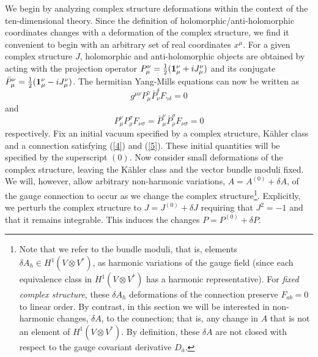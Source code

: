 \documentclass[12pt]{article}
\numberwithin{equation}{section}
\begin{document}
We begin by analyzing complex structure deformations within the context of the ten-dimensional theory. Since the definition of holomorphic/anti-holomorphic coordinates changes with a deformation of the complex structure, we find it convenient to begin with an arbitrary set of real coordinates $x^{\mu}$. For a given complex structure $J$, holomorphic and anti-holomorphic objects are obtained by acting with the projection operator $P_{\mu}^{\nu}=\frac{1}{2}({ \bf{1}}_{\mu}^{\nu}+iJ_{\mu}^{\nu})$ and its conjugate
${\bar{P}}_{\mu}^{\nu}=\frac{1}{2}({ \bf{1}}_{\mu}^{\nu}-iJ_{\mu}^{\nu})$. The hermitian Yang-Mills equations can now be written as
% 
\begin{equation}
g^{\mu\nu}P_{\mu}^{\gamma}{\bar{P}}_{\nu}^{\delta}F_{\gamma\delta}=0
\label{4}
\end{equation}
% 
and
% 
\begin{equation}
P_{\mu}^{\nu}P_{\rho}^{\sigma}F_{\nu\sigma}={\bar{P}}_{\mu}^{\nu}{\bar{P}}_{\rho}^{\sigma}F_{\nu\sigma}= 0 
\label{5}
\end{equation}
% 
respectively. Fix an initial vacuum specified by a complex structure, K\"ahler class and a connection satisfying (\ref{4}) and (\ref{5}). These initial quantities will be specified by the superscript $(0)$. Now consider small deformations of the complex structure, leaving the K\"ahler class and the vector bundle moduli fixed. We will, however, allow arbitrary non-harmonic variations, $A=A^{(0)}+\delta A$, of the gauge connection to occur as we change the complex structure\footnote{Note that we refer to the bundle moduli, that is, elements $\delta A_h \in H^1(V\otimes V^*)$, as harmonic variations of the gauge field (since each equivalence class in $H^1(V\otimes V^*)$ has a harmonic representative). For {\it fixed complex structure}, these $\delta A_h$ deformations of the connection preserve $F_{ab}=0$ to linear order. By contrast, in this section we will be interested in non-harmonic changes, $\delta A$, to the connection; that is, any change in $A$ that is not an element of $H^1(V\otimes V^*)$. By definition, these $\delta A$ are not closed with respect to the gauge covariant derivative $D_{\bar{a}}$. }. Explicitly, we perturb the complex structure to $J=J^{(0)}+\delta J$  requiring that $J^{2}=-1$ and that it remains integrable. This induces the changes $P=P^{(0)}+\delta P$.
\end{document}
